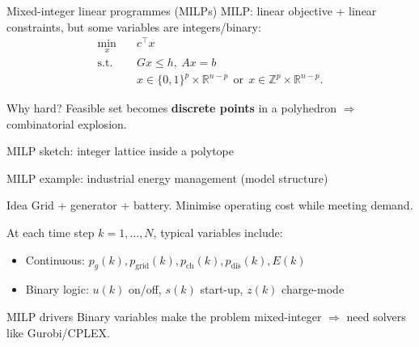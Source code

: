 \documentclass[aspectratio=169,10pt]{beamer}
\newcommand{\R}{\mathbb{R}}
\newcommand{\Z}{\mathbb{Z}}
\begin{document}
\begin{frame}{Mixed-integer linear programmes (MILPs)}
MILP: linear objective + linear constraints, but some variables are integers/binary:
\begin{equation*}
\begin{aligned}
\min_x\quad & c^\top x\\
\text{s.t.}\quad &Gx\le h,\ Ax=b\\
&x\in\{0,1\}^p\times \R^{n-p}\ \ \text{or}\ \ x\in\Z^p\times\R^{n-p}.
\end{aligned}
\end{equation*}

\begin{alertbox}{Why hard?}
Feasible set becomes \textbf{discrete points} in a polyhedron $\Rightarrow$ combinatorial explosion.
\end{alertbox}
\end{frame}

\begin{frame}{MILP sketch: integer lattice inside a polytope}
\begin{center}
\end{center}
\end{frame}

\begin{frame}{MILP example: industrial energy management (model structure)}
\begin{examplebox}{Idea}
Grid + generator + battery. Minimise operating cost while meeting demand.
\end{examplebox}

At each time step $k=1,\dots,N$, typical variables include:
\begin{itemize}
  \item Continuous: $p_g(k), p_{\mathrm{grid}}(k), p_{\mathrm{ch}}(k), p_{\mathrm{dis}}(k), E(k)$
  \item Binary logic: $u(k)$ on/off, $s(k)$ start-up, $z(k)$ charge-mode
\end{itemize}

\begin{alertbox}{MILP drivers}
Binary variables make the problem mixed-integer \(\Rightarrow\) need solvers like Gurobi/CPLEX.
\end{alertbox}
\end{frame}
\end{document}
